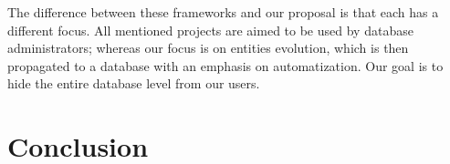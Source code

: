 \documentclass[runningheads]{comsis}
\begin{document}
The difference between these frameworks and our proposal is that each has a different focus. All mentioned projects are aimed to  be used by database administrators; whereas our focus is on entities evolution, which is then propagated to a database with an emphasis on automatization. Our goal is to hide the entire database level from our users.






\section{Conclusion}

\end{document}
